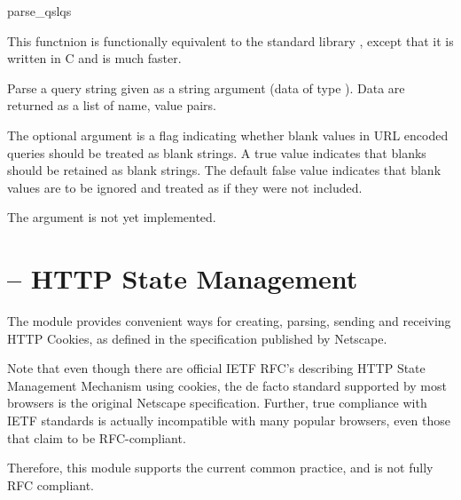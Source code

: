 \begin{funcdesc}{parse_qsl}{qs}

This functnion is functionally equivalent to the standard library
 , except that it is written in C and is
much faster. 

Parse a query string given as a string argument (data of type
).  Data are
returned as a list of name, value pairs.

The optional argument  is a flag indicating
whether blank values in URL encoded queries should be treated as blank
strings.  A true value indicates that blanks should be retained as
blank strings.  The default false value indicates that blank values
are to be ignored and treated as if they were not included.

 The  argument is not yet implemented.

\end{funcdesc}

\section{ -- HTTP State Management\label{pyapi-cookie}}

The  module provides convenient ways for creating,
parsing, sending and receiving HTTP Cookies, as defined in the
specification published by Netscape.

Note that even though there are official IETF RFC's describing
HTTP State Management Mechanism using cookies, the de facto standard
supported by most browsers is the original Netscape specification.
Further, true compliance with IETF standards is actually incompatible
with many popular browsers, even those that claim to be RFC-compliant.

Therefore, this module supports the current common practice, and is not
fully RFC compliant.

\begin{seealso}
\end{seealso}

